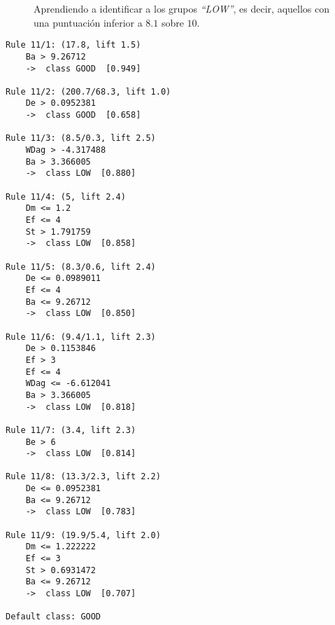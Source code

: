 \begin{figure}[H]
\centering
{}
\caption{Aprendiendo a identificar a los grupos \emph{``LOW''}, es decir, aquellos con una puntuación inferior a $8.1$ sobre $10$.}
\label{fig:cm2}
\end{figure}

\begin{tcolorbox}[title=Reglas de clasificación para identificar grupos de tipo \emph{``LOW''}.]
  \makeatletter
  \makeatother
\begin{multicols}{2}
    \begin{verbatim}
Rule 11/1: (17.8, lift 1.5)
	Ba > 9.26712
	->  class GOOD  [0.949]

Rule 11/2: (200.7/68.3, lift 1.0)
	De > 0.0952381
	->  class GOOD  [0.658]

Rule 11/3: (8.5/0.3, lift 2.5)
	WDag > -4.317488
	Ba > 3.366005
	->  class LOW  [0.880]

Rule 11/4: (5, lift 2.4)
	Dm <= 1.2
	Ef <= 4
	St > 1.791759
	->  class LOW  [0.858]

Rule 11/5: (8.3/0.6, lift 2.4)
	De <= 0.0989011
	Ef <= 4
	Ba <= 9.26712
	->  class LOW  [0.850]

Rule 11/6: (9.4/1.1, lift 2.3)
	De > 0.1153846
	Ef > 3
	Ef <= 4
	WDag <= -6.612041
	Ba > 3.366005
	->  class LOW  [0.818]

Rule 11/7: (3.4, lift 2.3)
	Be > 6
	->  class LOW  [0.814]

Rule 11/8: (13.3/2.3, lift 2.2)
	De <= 0.0952381
	Ba <= 9.26712
	->  class LOW  [0.783]

Rule 11/9: (19.9/5.4, lift 2.0)
	Dm <= 1.222222
	Ef <= 3
	St > 0.6931472
	Ba <= 9.26712
	->  class LOW  [0.707]

Default class: GOOD
    \end{verbatim}
  \end{multicols}
\label{rules2}
\end{tcolorbox}

